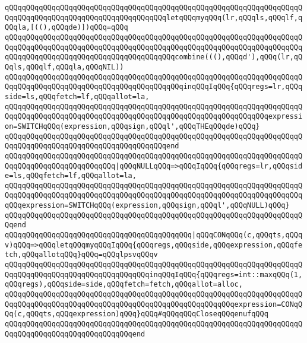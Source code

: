 \verb|qQQqqQQqqQQqqQQqqQQqqQQqqQQqqQQqqQQqqQQqqQQqqQQqqQQqqQQqqQQqqQQqqQQqqQQqqQQqqQQqqQQqqQQqqQQqqQQqqQQqqQQqqQQqletqQQqmyqQQq(lr,qQQqls,qQQqlf,qQQqla,[((),qQQqde)])qQQq=qQQq|\newline
\verb|qQQqqQQqqQQqqQQqqQQqqQQqqQQqqQQqqQQqqQQqqQQqqQQqqQQqqQQqqQQqqQQqqQQqqQQqqQQqqQQqqQQqqQQqqQQqqQQqqQQqqQQqqQQqqQQqqQQqqQQqqQQqqQQqqQQqqQQqqQQqqQQqqQQqqQQqqQQqqQQqqQQqqQQqqQQqqQQqqQQqcombine(((),qQQqd'),qQQq(lr,qQQqls,qQQqlf,qQQqla,qQQqNIL))|\newline
\verb|qQQqqQQqqQQqqQQqqQQqqQQqqQQqqQQqqQQqqQQqqQQqqQQqqQQqqQQqqQQqqQQqqQQqqQQqqQQqqQQqqQQqqQQqqQQqqQQqqQQqqQQqqQQqqQQqinqQQqIqQQq{qQQqregs=lr,qQQqside=ls,qQQqfetch=lf,qQQqallot=la,|\newline
\verb|qQQqqQQqqQQqqQQqqQQqqQQqqQQqqQQqqQQqqQQqqQQqqQQqqQQqqQQqqQQqqQQqqQQqqQQqqQQqqQQqqQQqqQQqqQQqqQQqqQQqqQQqqQQqqQQqqQQqqQQqqQQqqQQqqQQqexpression=SWITCHqQQq(expression,qQQqsign,qQQql',qQQqTHEqQQqde)qQQq}|\newline
\verb|qQQqqQQqqQQqqQQqqQQqqQQqqQQqqQQqqQQqqQQqqQQqqQQqqQQqqQQqqQQqqQQqqQQqqQQqqQQqqQQqqQQqqQQqqQQqqQQqqQQqqQQqqQQqend|\newline
\verb|qQQqqQQqqQQqqQQqqQQqqQQqqQQqqQQqqQQqqQQqqQQqqQQqqQQqqQQqqQQqqQQqqQQqqQQqqQQqqQQqqQQqqQQqqQQqqQQq|\verb#|qQQqNULLqQQq=>qQQqIqQQq{qQQqregs=lr,qQQqside=ls,qQQqfetch=lf,qQQqallot=la,#\newline
\verb|qQQqqQQqqQQqqQQqqQQqqQQqqQQqqQQqqQQqqQQqqQQqqQQqqQQqqQQqqQQqqQQqqQQqqQQqqQQqqQQqqQQqqQQqqQQqqQQqqQQqqQQqqQQqqQQqqQQqqQQqqQQqqQQqqQQqqQQqqQQqqQQqexpression=SWITCHqQQq(expression,qQQqsign,qQQql',qQQqNULL)qQQq}|\newline
\verb|qQQqqQQqqQQqqQQqqQQqqQQqqQQqqQQqqQQqqQQqqQQqqQQqqQQqqQQqqQQqqQQqqQQqqQQqend|\newline
\newline
\verb|qQQqqQQqqQQqqQQqqQQqqQQqqQQqqQQqqQQqqQQqqQQq|\verb#|qQQqCONqQQq(c,qQQqts,qQQqv)qQQq=>qQQqletqQQqmyqQQqIqQQq{qQQqregs,qQQqside,qQQqexpression,qQQqfetch,qQQqallotqQQq}qQQq=qQQqlpsvqQQqv#\newline
\verb|qQQqqQQqqQQqqQQqqQQqqQQqqQQqqQQqqQQqqQQqqQQqqQQqqQQqqQQqqQQqqQQqqQQqqQQqqQQqqQQqqQQqqQQqqQQqqQQqqQQqqQQqinqQQqIqQQq{qQQqregs=int::maxqQQq(1,qQQqregs),qQQqside=side,qQQqfetch=fetch,qQQqallot=alloc,|\newline
\verb|qQQqqQQqqQQqqQQqqQQqqQQqqQQqqQQqqQQqqQQqqQQqqQQqqQQqqQQqqQQqqQQqqQQqqQQqqQQqqQQqqQQqqQQqqQQqqQQqqQQqqQQqqQQqqQQqqQQqqQQqqQQqexpression=CONqQQq(c,qQQqts,qQQqexpression)qQQq}qQQq#qQQqqQQqCloseqQQqenufqQQq|\newline
\verb|qQQqqQQqqQQqqQQqqQQqqQQqqQQqqQQqqQQqqQQqqQQqqQQqqQQqqQQqqQQqqQQqqQQqqQQqqQQqqQQqqQQqqQQqqQQqqQQqqQQqend|\newline
